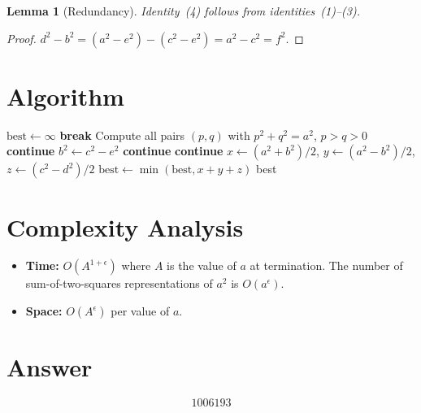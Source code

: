 \documentclass[12pt]{article}
\newtheorem{lemma}[theorem]{Lemma}
\begin{document}
\begin{lemma}[Redundancy]
Identity~(4) follows from identities~(1)--(3).
\end{lemma}

\begin{proof}
$d^2 - b^2 = (a^2 - e^2) - (c^2 - e^2) = a^2 - c^2 = f^2$.
\end{proof}

\section{Algorithm}

\begin{algorithmic}[1]
\State $\text{best} \gets \infty$
     \textbf{break} \EndIf
    \State Compute all pairs $(p,q)$ with $p^2 + q^2 = a^2$, $p > q > 0$
     
         
             \textbf{continue} \EndIf
            \State $b^2 \gets c^2 - e^2$ 
             \textbf{continue} \EndIf
             \textbf{continue} \EndIf
            \State $x \gets (a^2+b^2)/2$, $y \gets (a^2-b^2)/2$, $z \gets (c^2-d^2)/2$
             $\text{best} \gets \min(\text{best}, x+y+z)$ \EndIf
        \EndFor
    \EndFor
\EndFor
\State \Return best
\end{algorithmic}

\section{Complexity Analysis}

\begin{itemize}
\item \textbf{Time:} $O(A^{1+\epsilon})$ where $A$ is the value of $a$ at termination. The number of sum-of-two-squares representations of $a^2$ is $O(a^\epsilon)$.
\item \textbf{Space:} $O(A^\epsilon)$ per value of $a$.
\end{itemize}

\section{Answer}

\[
\boxed{1006193}
\]
\end{document}
